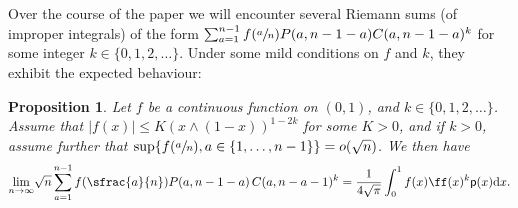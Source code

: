 \documentclass[JEP,XML,SOM,Unicode,NoFloatCountersInSection, NoEqCountersInSection,published]{cedram}
\newcommand{\pp}{\mathsf{p}}
\newcommand{\dd}{\mathrm{d}}
\newtheorem{prop}[thm]{Proposition}
\theoremstyle{definition}
\begin{document}
Over the course of the paper we will encounter several Riemann sums (of improper integrals) of the form
$
\sum_{a=1}^{n-1} f(\sfrac{a}{n})P(a,n-1-a) C(a,n-1-a)^k
$ for some integer $k \in \{0,1,2,\dots \}$. Under some mild conditions on $f$ and $k$, they exhibit the expected behaviour:

\begin{prop}\label{prop:generalintegrallimit}
Let $f$ be a continuous function on $(0,1)$, and $k\in \{0,1,2, \dots \}$. Assume that $|f(x)|\leq K(x \wedge (1-x))^{1-2k}$ for some $K>0$, and if $k>0$, assume further that $\sup\{f(\sfrac{a}{n}),a\in\{1,\ldots,n-1\}\}=o(\sqrt{n})$. We then have
\begin{equation}\label{eq:limsumwithC}
\underset{n\to\infty}\lim\sqrt{n} \sum_{a=1}^{n-1} f{(\sfrac{a}{n})}P(a,n-1-a)\,C(a,n-a-1)^k = \frac{1}{4\sqrt{\pi}}\int_0^1 f(x)\ff(x)^k \pp(x) \dd x.
\end{equation}
\end{prop}
\end{document}
